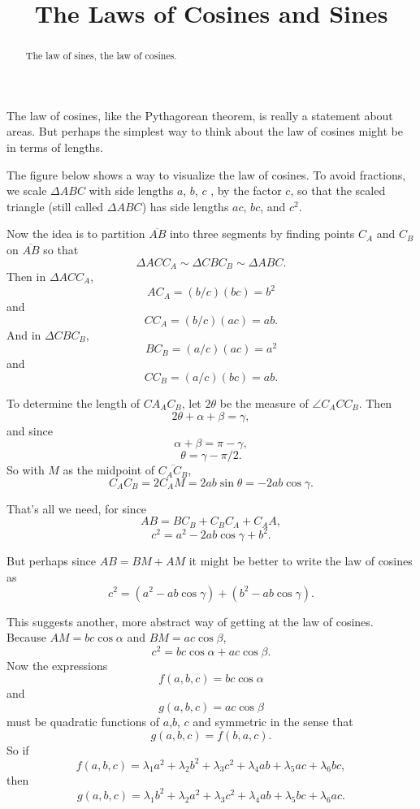 \documentclass{ximera}
\title{The Laws of Cosines and Sines}
\begin{document}
\begin{abstract}
The law of sines, the law of cosines.
\end{abstract}
\maketitle

\begin{exploration}
The law of cosines, like the Pythagorean theorem, is really a statement about areas. But perhaps the simplest way to think about the law of cosines might be in terms of lengths. 

The figure below shows a way to visualize the law of cosines. To avoid fractions, we scale $\Delta ABC$ with side lengths $a$, $b$, $c$ , by the factor $c$, so that the scaled triangle (still called $\Delta ABC$) has side lengths $ac$, $bc$, and $c^2$.

 
\begin{onlineOnly}
    \begin{center}
\end{center}
\end{onlineOnly}


Now the idea is to partition $\overline{AB}$ into three segments by finding points $C_A$ and $C_B$ on $\overline{AB}$ so that
\[ 
    \Delta ACC_A \sim \Delta C BC_B \sim \Delta ABC .
\]
Then in $\Delta ACC_A$,
\[
    AC_A = (b/c)(bc) = b^2
\]
and
\[
  CC_A = (b/c)(ac) = ab.
\]
And in $\Delta C BC_B $,
\[
    BC_B = (a/c)(ac) = a^2
\]
and
\[
  CC_B = (a/c)(bc) = ab.
\]

To determine the length of $CA_A C_B$, let $2\theta$ be the measure of $\angle C_A C C_B$. Then
\[
     2\theta + \alpha + \beta = \gamma ,
\]
and since
\[
    \alpha + \beta = \pi - \gamma ,
\]
\[
   \theta = \gamma - \pi/2.
\]
So with $M$ as the midpoint of $\overline{C_A C_B}$,
\[
   C_A C_B = 2 C_A M = 2ab \sin \theta = -2ab\cos\gamma .
\]

That's all we need, for since
\[
    AB = BC_B + C_B C_A + C_AA ,
\]
\[
  c^2 = a^2 - 2ab \cos \gamma + b^2 .
\]

But perhaps since $AB = BM +AM$ it might be better to write the law of cosines as
\[
   c^2 = (a^2 -ab\cos\gamma) + (b^2- ab\cos \gamma) .
\]

This suggests another, more abstract way of getting at the law of cosines. Because $AM = bc \cos \alpha$ and $BM = ac \cos\beta$,
\[
   c^2 = bc \cos \alpha + ac \cos \beta .
\]
Now the expressions 
\[
   f(a,b,c) = bc \cos\alpha
\]
and
\[
   g(a,b,c) = ac \cos \beta
\]
must be quadratic functions of $a$,$b$, $c$ and symmetric in the sense that
\[
  g(a,b,c) = f(b,a,c) .
\]
So if
\[
  f(a,b,c) = \lambda_1 a^2 + \lambda_2 b^2 + \lambda_3 c^2 + \lambda_4 ab + \lambda_5 ac + \lambda_6 bc ,
\]
then
\[
  g(a,b,c) = \lambda_1 b^2 + \lambda_2 a^2 + \lambda_3 c^2 + \lambda_4 ab + \lambda_5 bc + \lambda_6 ac  .
\]

\end{exploration}
\end{document}
